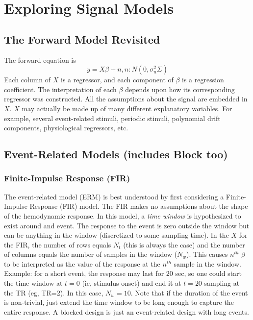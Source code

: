 \documentclass{article}
\begin{document}
\section{Exploring Signal Models}

\subsection{The Forward Model Revisited}

\noindent
The forward equation is
\begin{equation}
y = X \beta + n, n: N(0,\sigma_n^2 \Sigma)
\end{equation}
Each column of $X$ is a regressor, and each component of $\beta$ is a
regression coefficient. The interpretation of each $\beta$ depends
upon how its corresponding regressor was constructed.  All the
assumptions about the signal are embedded in $X$. $X$ may actually be
made up of many different explanatory variables. For example, several
event-related stimuli, periodic stimuli, polynomial drift components,
physiological regressors, etc.

\subsection{Event-Related Models (includes Block too)}


\subsubsection{Finite-Impulse Response (FIR)}

\noindent
The event-related model (ERM) is best understood by first considering
a Finite-Impulse Response (FIR) model. The FIR makes no assumptions
about the shape of the hemodynamic response. In this model, a {\em
time window} is hypothesized to exist around and event. The response
to the event is zero outside the window but can be anything in the
window (discretized to some sampling time). In the $X$ for the FIR,
the number of rows equals $N_t$ (this is always the case) and the
number of columns equals the number of samples in the window
($N_w$). This causes $n^{th}$ $\beta$ to be interpreted as the value
of the response at the $n^{th}$ sample in the window. Example: for a
short event, the response may last for 20 sec, so one could start the
time window at $t=0$ (ie, stimulus onset) and end it at $t=20$
sampling at the TR (eg, TR=2). In this case, $N_w = 10$. Note that if
the duration of the event is non-trivial, just extend the time window
to be long enough to capture the entire response. A blocked design is
just an event-related design with long events.\\
\end{document}
